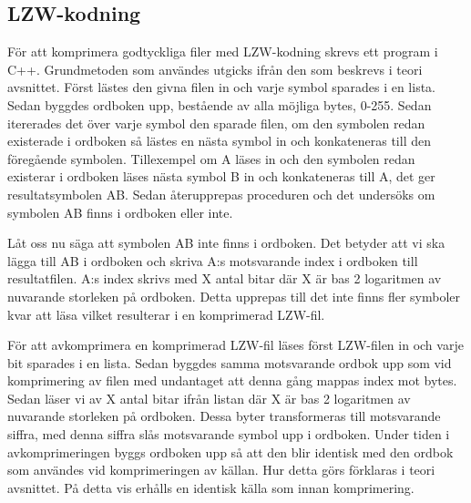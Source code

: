\subsection{LZW-kodning}
För att komprimera godtyckliga filer med LZW-kodning skrevs ett program i C++. Grundmetoden som användes utgicks ifrån den som beskrevs i teori avsnittet. Först lästes den givna filen in och varje symbol sparades i en lista. Sedan byggdes ordboken upp, bestående av alla möjliga bytes, 0-255. Sedan itererades det över varje symbol den sparade filen, om den symbolen redan existerade i ordboken så lästes en nästa symbol in och konkateneras till den föregående symbolen. Tillexempel om A läses in och den symbolen redan existerar i ordboken läses nästa symbol B in och konkateneras till A, det ger resultatsymbolen AB. Sedan återupprepas proceduren och det undersöks om symbolen AB finns i ordboken eller inte.

Låt oss nu säga att symbolen AB inte finns i ordboken. Det betyder att vi ska lägga till AB i ordboken och skriva A:s motsvarande index i ordboken till resultatfilen. A:s index skrivs med X antal bitar där X är bas 2 logaritmen av nuvarande storleken på ordboken. Detta upprepas till det inte finns fler symboler kvar att läsa vilket resulterar i en komprimerad LZW-fil.

För att avkomprimera en komprimerad LZW-fil läses först LZW-filen in och varje bit sparades i en lista. Sedan byggdes samma motsvarande ordbok upp som vid komprimering av filen med undantaget att denna gång mappas index mot bytes. Sedan läser vi av X antal bitar ifrån listan där X är bas 2 logaritmen av nuvarande storleken på ordboken. Dessa byter transformeras till motsvarande siffra, med denna siffra slås motsvarande symbol upp i ordboken. Under tiden i avkomprimeringen byggs ordboken upp så att den blir identisk med den ordbok som användes vid komprimeringen av källan. Hur detta görs förklaras i teori avsnittet. På detta vis erhålls en identisk källa som innan komprimering.




